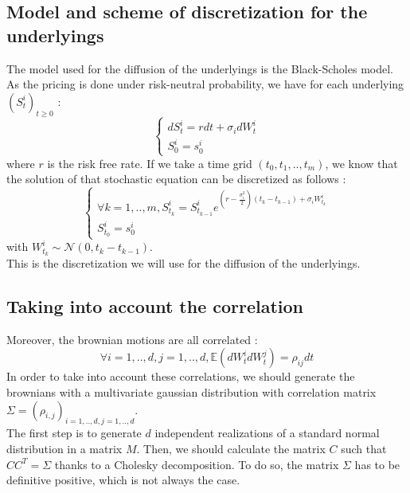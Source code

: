 \documentclass[a4paper,11pt,english]{book}
\begin{document}
\subsection{Model and scheme of discretization for the underlyings}
\label{subsec:underlying-discretization}
The model used for the diffusion of the underlyings is the Black-Scholes model. As the pricing is done under risk-neutral probability, we have for each underlying $(S^{i}_{t})_{t\geq0}$ :
$$
\left\{
    \begin{array}{ll}
        dS_{t}^{i}=rdt+\sigma_{i}dW_{t}^{i} \\
        S_{0}^{i}=s_{0}^{i} 
    \end{array}
\right.
$$
where $r$ is the risk free rate.
If we take a time grid $(t_{0},t_{1},..,t_{m})$, we know that the solution of that stochastic equation can be discretized as follows :
$$
\left\{
    \begin{array}{ll}
         \forall k=1,..,m,  S_{t_{k}}^{i}=S_{t_{k-1}}^{i}e^{(r-\frac{\sigma_{i}^{2}}{2})(t_{k}-t_{k-1})+\sigma_{i}W_{t_{k}}^{i}}\\
        S_{t_{0}}^{i}=s_{0}^{i} 
    \end{array}
\right.
$$
with $W_{t_{k}}^{i} \sim \mathcal{N}(0,t_{k}-t_{k-1})$.\\
This is the discretization we will use for the diffusion of the underlyings.
\subsection{Taking into account the correlation}
Moreover, the brownian motions are all correlated : $$\forall i=1,..,d,j=1,..,d, \mathbb{E}(dW_{t}^{i}dW_{t}^{j})=\rho_{ij}dt$$
In order to take into account these correlations, we should generate the brownians with a multivariate gaussian distribution with correlation matrix $\Sigma=(\rho_{i,j})_{i=1,..,d,j=1,..,d}$.\\

The first step is to generate $d$ independent realizations of a standard normal distribution in a matrix $M$. Then, we should calculate the matrix $C$ such that $CC^{T}=\Sigma$ thanks to a Cholesky decomposition. To do so, the matrix $\Sigma$ has to be definitive positive, which is not always the case. \\
\end{document}
